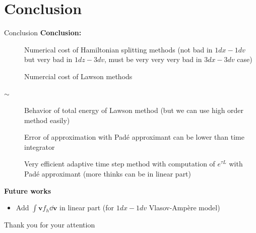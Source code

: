 \documentclass{beamer}
\newcommand{\cmark}{{\color{dgreen}\ding{52}}}
\newcommand{\xmark}{{\color{red}\ding{55}}}
\newcommand{\bmark}{{\color{orange}$\sim$}}
\newcommand{\mbold}[1]{{\textbf{\color{PLB}#1}}}
\newcommand{\Mvb}[1]{\boldsymbol{#1}}
\begin{document}
\section{Conclusion}
\begin{frame}{Conclusion}
  \mbold{Conclusion:}
  \begin{description}
    \item[\xmark] Numerical cost of Hamiltonian splitting methods (not bad in $1dx-1dv$ but very bad in $1dz-3dv$, must be very very very bad in $3dx-3dv$ case)
    \item[\cmark] Numercial cost of Lawson methods
    \item[\bmark] Behavior of total energy of Lawson method (but we can use high order method easily)
    \item[\cmark] Error of approximation with Padé approximant can be lower than time integrator
    \item[\cmark] Very efficient adaptive time step method with computation of $e^{\tau L}$ with Padé approximant (more thinks can be in linear part)
  \end{description}
  \mbold{Future works}
  \begin{itemize}
    \item Add $\int \Mvb{v}f_h\dd{\Mvb{v}}$ in linear part (for $1dx-1dv$ Vlasov-Ampère model)
  \end{itemize}
\end{frame}

\begin{frame}[t]
  \vfill
  { Thank you for your attention}
  \vfill
\end{frame}
\end{document}
